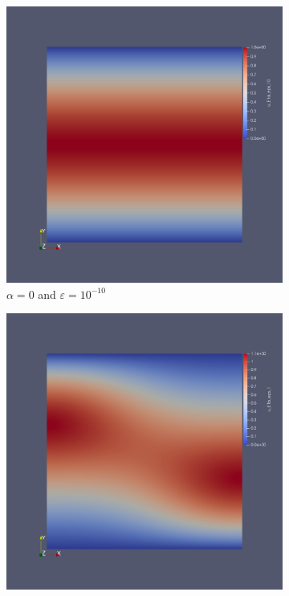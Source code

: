 \documentclass[12pt]{ociamthesis}
\begin{document}
\begin{figure}[H]
\begin{subfigure}{0.44\textwidth}
     \includegraphics[width=\textwidth]{Pics/uf/U_E1a_eps10.png}
     \caption{$\alpha=0$ and $\varepsilon = 10^{-10}$}
 \end{subfigure}
 \begin{subfigure}{0.44\textwidth}
     \includegraphics[width=\textwidth]{Pics/uf/U_E1b_eps1.png}

\end{subfigure}
\end{figure}
\end{document}
